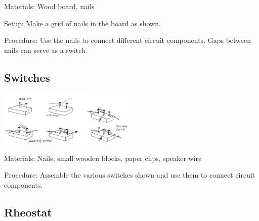 \begin{multicols}{2}
\begin{description*}
\item[Materials:]{Wood board, nails}
\item[Setup:]{Make a grid of nails in the board as shown.}
\item[Procedure:]{Use the nails to connect different circuit components. Gaps between nails can serve as a switch.}
\end{description*}

\subsection{Switches}

\begin{center}
\includegraphics[width=0.49\textwidth]{./img/vso/switches.png}
\end{center}

\begin{description*}
\item[Materials:]{Nails, small wooden blocks, paper clips, speaker wire}
\item[Procedure:]{Assemble the various switches shown and use them to connect circuit components.}
\end{description*}

\subsection{Rheostat}


\end{multicols}
